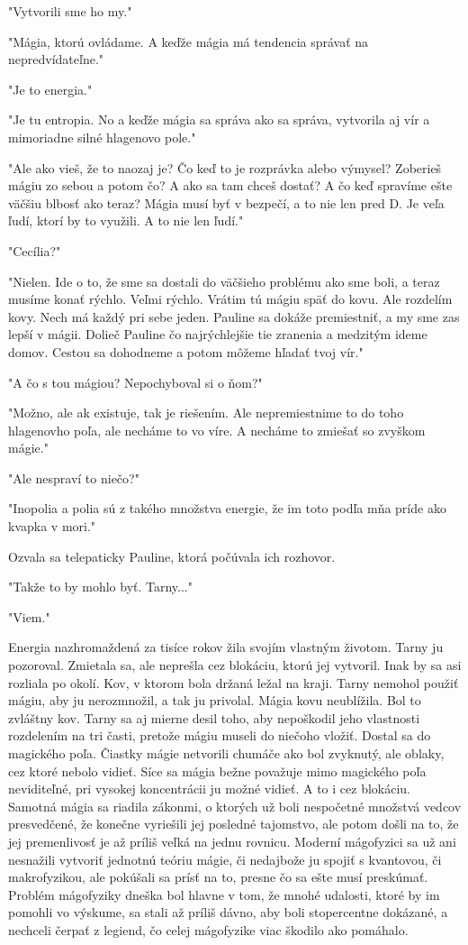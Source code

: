 \documentclass{book}
\begin{document}
"$ $Vytvorili sme ho my."$ $ 

"$ $Mágia, ktorú ovládame. A keďže mágia má tendencia správať na nepredvídateľne."$ $ 

"$ $Je to energia."$ $ 

"$ $Je tu entropia. No a keďže mágia sa správa ako sa správa, vytvorila aj vír a mimoriadne silné hlagenovo pole."$ $ 

"$ $Ale ako vieš, že to naozaj je? Čo keď to je rozprávka alebo výmysel? Zoberieš mágiu zo sebou a potom čo? A ako sa tam chceš dostať? A čo keď spravíme ešte väčšiu blbosť ako teraz? Mágia musí byť v bezpečí, a to nie len pred D. Je veľa ľudí, ktorí by to využili. A to nie len ľudí."$ $ 

"$ $Cecília?"$ $ 

"$ $Nielen. Ide o to, že sme sa dostali do väčšieho problému ako sme boli, a teraz musíme konať rýchlo. Veľmi rýchlo. Vrátim tú mágiu späť do kovu. Ale rozdelím kovy. Nech má každý pri sebe jeden. Pauline sa dokáže premiestniť, a my sme zas lepší v mágii. Dolieč Pauline čo najrýchlejšie tie zranenia a medzitým ideme domov. Cestou sa dohodneme a potom môžeme hľadať tvoj vír."$ $ 

"$ $A čo s tou mágiou? Nepochyboval si o ňom?"$ $ 

"$ $Možno, ale ak existuje, tak je riešením. Ale nepremiestnime to do toho hlagenovho poľa, ale necháme to vo víre. A necháme to zmiešať so zvyškom mágie."$ $ 

"$ $Ale nespraví to niečo?"$ $ 

"$ $Inopolia a polia sú z takého množstva energie, že im toto podľa mňa príde ako kvapka v mori."$ $ 

Ozvala sa telepaticky Pauline, ktorá počúvala ich rozhovor.

"$ $Takže to by mohlo byť. Tarny..."$ $ 

"$ $Viem."$ $ 

Energia nazhromaždená za tisíce rokov žila svojím vlastným životom. Tarny ju pozoroval. Zmietala sa, ale neprešla cez blokáciu, ktorú jej vytvoril. Inak by sa asi rozliala po okolí. Kov, v ktorom bola držaná ležal na kraji. Tarny nemohol použiť mágiu, aby ju nerozmnožil, a tak ju privolal. Mágia kovu neublížila. Bol to zvláštny kov. Tarny sa aj mierne desil toho, aby nepoškodil jeho vlastnosti rozdelením na tri časti, pretože mágiu museli do niečoho vložiť. Dostal sa do magického poľa. Čiastky mágie netvorili chumáče ako bol zvyknutý, ale oblaky, cez ktoré nebolo vidieť. Síce sa mágia bežne považuje mimo magického poľa neviditeľné, pri vysokej koncentrácii ju možné vidieť. A to i cez blokáciu. Samotná mágia sa riadila zákonmi, o ktorých už boli nespočetné množstvá vedcov presvedčené, že konečne vyriešili jej posledné tajomstvo, ale potom došli na to, že jej premenlivosť je až príliš veľká na jednu rovnicu. Moderní mágofyzici sa už ani nesnažili vytvoriť jednotnú teóriu mágie, či nedajbože ju spojiť s kvantovou, či makrofyzikou, ale pokúšali sa prísť na to, presne čo sa ešte musí preskúmať. Problém mágofyziky dneška bol hlavne v tom, že mnohé udalosti, ktoré by im pomohli vo výskume, sa stali až príliš dávno, aby boli stopercentne dokázané, a nechceli čerpať z legiend, čo celej mágofyzike viac škodilo ako pomáhalo.
\end{document}
